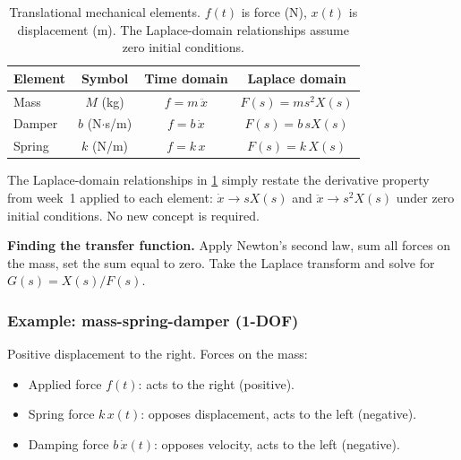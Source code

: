 \documentclass[../../book.tex]{subfiles}
\begin{document}
\begin{table}[htbp]
\centering
\caption{Translational mechanical elements.  $f(t)$ is force (N),
  $x(t)$ is displacement (m).  The Laplace-domain relationships assume zero
  initial conditions.}
\label{tab:translational}
\begin{tabular}{lccc}
\toprule
Element & Symbol & Time domain & Laplace domain \\
\midrule
Mass    & $M$ (kg)  & $f = m\,\ddot{x}$  & $F(s) = ms^2 X(s)$ \\[4pt]
Damper  & $b$ (N$\cdot$s/m) & $f = b\,\dot{x}$ & $F(s) = b\,sX(s)$ \\[4pt]
Spring  & $k$ (N/m) & $f = k\, x$         & $F(s) = k\,X(s)$ \\[4pt]
\bottomrule
\end{tabular}
\end{table}

The Laplace-domain relationships in \cref{tab:translational} simply restate
the derivative property from week~1 applied to each element: $\dot{x}
\rightarrow sX(s)$ and $\ddot{x} \rightarrow s^2 X(s)$ under zero initial
conditions.  No new concept is required.

\textbf{Finding the transfer function.}  Apply Newton's second law, sum all
forces on the mass, set the sum equal to zero.  Take the Laplace transform
and solve for $G(s) = X(s)/F(s)$.

\subsubsection*{Example: mass-spring-damper (1-DOF)}


Positive displacement to the right.  Forces on the mass:
\begin{itemize}
  \item Applied force $f(t)$: acts to the right (positive).
  \item Spring force $k \, x(t)$: opposes displacement, acts to the left (negative).
  \item Damping force $b \, \dot{x}(t)$: opposes velocity, acts to the left (negative).
\end{itemize}
\end{document}
